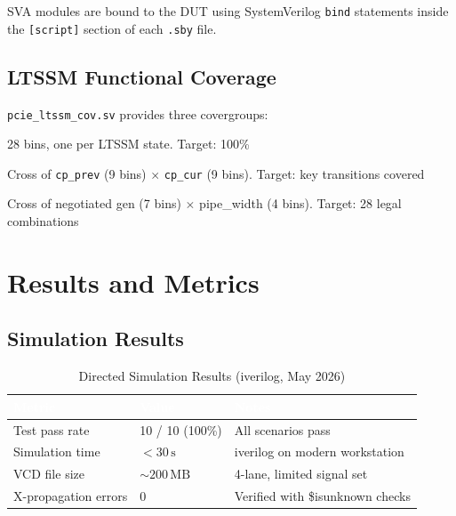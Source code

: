 \documentclass[12pt,a4paper]{report}
\newcommand{\theadcell}[1]{%
  \cellcolor{tablehead}\textcolor{white}{\textbf{#1}}}
\begin{document}
SVA modules are bound to the DUT using SystemVerilog \texttt{bind} statements
inside the \texttt{[script]} section of each \texttt{.sby} file.

\section{LTSSM Functional Coverage}

\texttt{pcie\_ltssm\_cov.sv} provides three covergroups:

\begin{description}[leftmargin=3.5cm,style=nextline]
  \item[\texttt{cg\_ltssm\_states}] 28 bins, one per LTSSM state. Target: 100\% \\
  \item[\texttt{cg\_ltssm\_transitions}] Cross of \texttt{cp\_prev} (9 bins)
    $\times$ \texttt{cp\_cur} (9 bins). Target: key transitions covered \\
  \item[\texttt{cg\_nego\_params}] Cross of negotiated gen (7 bins) $\times$
    pipe\_width (4 bins). Target: 28 legal combinations \\
\end{description}

\chapter{Results and Metrics}\label{ch:results}

\section{Simulation Results}

\begin{table}[H]
\centering
\caption{Directed Simulation Results (iverilog, May 2026)}
\label{tab:simresults}
\begin{tabular}{lll}
  \toprule
  \theadcell{Metric} & \theadcell{Value} & \theadcell{Notes} \\
  \midrule
  Test pass rate     & 10 / 10 (100\%)    & All scenarios pass \\
  Simulation time    & $<30\,\text{s}$    & iverilog on modern workstation \\
  VCD file size      & $\sim 200\,\text{MB}$ & 4-lane, limited signal set \\
  X-propagation errors & 0               & Verified with \$isunknown checks \\
  \bottomrule
\end{tabular}
\end{table}
\end{document}
